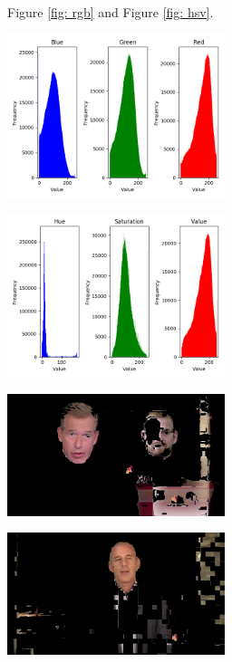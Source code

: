 \documentclass{article}
\begin{document}
Figure \ref{fig: rgb} and Figure \ref{fig: hsv}.

\begin{minipage}{0.5\linewidth}
 \label{fig: rgb}
\centering
\includegraphics[width=2.5in]{../output/f_train_rgb_distributions.png}
\end{minipage}%
\begin{minipage}{0.5\linewidth}
 \label{fig: hsv}
\centering
\includegraphics[width=2.5in]{../output/f_train_hsv_distributions.png}
\end{minipage}

\begin{minipage}{0.5\linewidth}
 \label{fig: hsv_bad}
\centering
\includegraphics[width=2.5in]{../output/clip_1_hsv/050.jpg}

\end{minipage}%
\begin{minipage}{0.5\linewidth}
 \label{fig: hsv_good}
\centering
\includegraphics[width=2.5in]{../output/clip_1_hsv/160.jpg}
\end{minipage}
\end{document}
